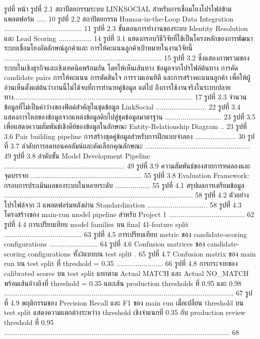 \documentclass[12pt,a4paper]{report}
\begin{document}
รูปที่ หน้า รูปที่ 2.1 สถาปัตยกรรมระบบ LINKSOCIAL สำหรับการเชื่อมโยงโปรไฟล์ข้ามแพลตฟอร์ม ..... 10 รูปที่ 2.2 สถาปัตยกรรม Human-in-the-Loop Data Integration ........................................ 11 รูปที่ 2.3 ขั้นตอนการทำงานของระบบ Identity Resolution และ Lead Scoring ................. 14 รูปที่ 3.1 แสดงกรอบวิธีวิจัยที่ใช้เป็นโครงหลักของการพัฒนาระบบเชื่อมโยงอัตลักษณ์ลูกค้าและ การให้คะแนนลูกค้าเป้าหมายในงานวิจัยนี้ ................................................................................. 15 รูปที่ 3.2 ซึ่งแสดงภาพรวมของระบบในเชิงธุรกิจและเชิงเทคนิคพร้อมกัน โดยให้เห็นเส้นทาง ข้อมูลจากโปรไฟล์ต้นทาง การคัด candidate pairs การให้คะแนน การตัดสินใจ การรวมเอนทิตี และการสร้างคะแนนลูกค้า เพื่อให้ผู้อ่านเห็นตั้งแต่ต้นว่างานนี้ไม่ได้จบที่การทำนายคู่ข้อมูล แต่ไป ถึงการใช้งานจริงในระบบปลายทาง............................................................................................ 17 รูปที่ 3.3 จำนวนข้อมูลที่ไม่เป็นค่าว่างของฟิลด์สำคัญในชุดข้อมูล LinkSocial .......................... 22 รูปที่ 3.4 แสดงการไหลของข้อมูลจากแหล่งข้อมูลดิบไปสู่ชุดข้อมูลมาตรฐาน ............................. 23 รูปที่ 3.5 เพื่อแสดงความสัมพันธ์เชิงคีย์ของข้อมูลในลักษณะ Entity-Relationship Diagram .. 23 รูปที่ 3.6 Pair building pipeline การสร้างชุดคู่ข้อมูลสำหรับการฝึกแบบจำลอง ..................... 30 รูปที่ 3.7 ลำดับการลดทอนคอลัมน์และคัดเลือกคุณลักษณะ ...................................................... 49 รูปที่ 3.8 ลำดับขั้น Model Development Pipeline .............................................................. 49 รูปที่ 3.9 ความสัมพันธ์ของสายการทดลองและจุดบรรจบ ......................................................... 55 รูปที่ 3.8 Evaluation Framework: กรอบการประเมินผลของระบบในหลายระดับ .................. 55 รูปที่ 4.1 สรุปผลการเตรียมข้อมูล ................................................................................................. 58 รูปที่ 4.2 ตัวอย่างโปรไฟล์จาก 3 แพลตฟอร์มหลังผ่าน Standardization ............................... 58 รูปที่ 4.3 โครงสร้างของ main-run model pipeline สำหรับ Project 1 ....................................... 62 รูปที่ 4.4 การเปรียบเทียบ model families บน final 41-feature split ........................................ 63 รูปที่ 4.5 การเปรียบเทียบ metric ของ candidate-scoring configurations ......................... 64 รูปที่ 4.6 Confusion matrices ของ candidate-scoring configurations ทั้ง3แบบบน test split . 65 รูปที่ 4.7 Confusion matrix ของ main run บน test split ที่ threshold = 0.35 ........................ 66 รูปที่ 4.8 การกระจายของ calibrated scores บน test split แยกตาม Actual MATCH และ Actual NO\_MATCH พร้อมเส้นอ้างอิงที่ threshold = 0.35 และเส้น production thresholds ที่ 0.95 และ 0.98 ...................................................................................................................... 67 รูปที่ 4.9 พฤติกรรมของ Precision Recall และ F1 ของ main run เมื่อเปลี่ยน threshold บน test split แสดงความแตกต่างระหว่าง threshold เชิงจำแนกที่ 0.35 กับ production review threshold ที่ 0.95 .................................................................................................................... 68\par
\clearpage
\end{document}
